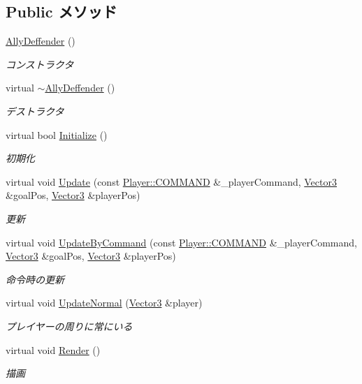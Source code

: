 \subsection*{Public メソッド}
\begin{DoxyCompactItemize}
\item 
\hyperlink{class_ally_deffender_a8f0a313e2a6f3375c8f48abff56715ef}{Ally\-Deffender} ()
\begin{DoxyCompactList}\small\item\em コンストラクタ \end{DoxyCompactList}\item 
virtual \hyperlink{class_ally_deffender_ac1bfe2d90290624b7a8e857bc9f1730c}{$\sim$\-Ally\-Deffender} ()
\begin{DoxyCompactList}\small\item\em デストラクタ \end{DoxyCompactList}\item 
virtual bool \hyperlink{class_ally_deffender_aca474cd4da5fac407bc29f8d14834ccc}{Initialize} ()
\begin{DoxyCompactList}\small\item\em 初期化 \end{DoxyCompactList}\item 
virtual void \hyperlink{class_ally_deffender_a53d33c150d0e72d04939cd53e0c25f5f}{Update} (const \hyperlink{class_player_a70057174eaea9fd441ca86cc7bb896ed}{Player\-::\-C\-O\-M\-M\-A\-N\-D} \&\-\_\-player\-Command, \hyperlink{struct_vector3}{Vector3} \&goal\-Pos, \hyperlink{struct_vector3}{Vector3} \&player\-Pos)
\begin{DoxyCompactList}\small\item\em 更新 \end{DoxyCompactList}\item 
virtual void \hyperlink{class_ally_deffender_a018968fae33a57fbbc42340fbae5328c}{Update\-By\-Command} (const \hyperlink{class_player_a70057174eaea9fd441ca86cc7bb896ed}{Player\-::\-C\-O\-M\-M\-A\-N\-D} \&\-\_\-player\-Command, \hyperlink{struct_vector3}{Vector3} \&goal\-Pos, \hyperlink{struct_vector3}{Vector3} \&player\-Pos)
\begin{DoxyCompactList}\small\item\em 命令時の更新 \end{DoxyCompactList}\item 
virtual void \hyperlink{class_ally_deffender_a27994c93aad3c05ca169639771677a74}{Update\-Normal} (\hyperlink{struct_vector3}{Vector3} \&player)
\begin{DoxyCompactList}\small\item\em プレイヤーの周りに常にいる \end{DoxyCompactList}\item 
virtual void \hyperlink{class_ally_deffender_aeb9a268c442d133fb0d8f7bb4a932a6f}{Render} ()
\begin{DoxyCompactList}\small\item\em 描画 \end{DoxyCompactList}\end{DoxyCompactItemize}
